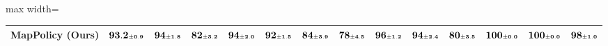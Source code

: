 \begin{table}[t]
\begin{adjustbox}{max width=\textwidth}
\begin{tabular}{l|c|cccccccccccc}
\midrule
MapPolicy (Ours) & $\mathbf{93.2{\scriptscriptstyle\pm 0.9}}$ & $\mathbf{94{\scriptscriptstyle\pm 1.8}}$ & $\mathbf{82{\scriptscriptstyle\pm 3.2}}$ & $\mathbf{94{\scriptscriptstyle\pm 2.0}}$ & $\mathbf{92{\scriptscriptstyle\pm 1.5}}$ & $\mathbf{84{\scriptscriptstyle\pm 3.9}}$ & $\mathbf{78{\scriptscriptstyle\pm 4.5}}$ & $\mathbf{96{\scriptscriptstyle\pm 1.2}}$ & $\mathbf{94{\scriptscriptstyle\pm 2.4}}$ & $\mathbf{80{\scriptscriptstyle\pm 3.5}}$ & $\mathbf{100{\scriptscriptstyle\pm 0.0}}$ & $\mathbf{100{\scriptscriptstyle\pm 0.0}}$ & $\mathbf{98{\scriptscriptstyle\pm 1.0}}$ \\
\bottomrule
\end{tabular}
\end{adjustbox}
\end{table}
